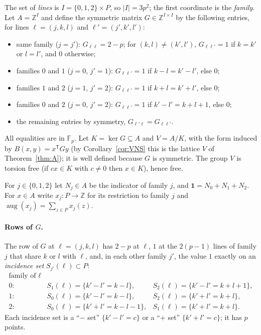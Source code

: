 \documentclass[11pt]{article}
\theoremstyle{definition}
\theoremstyle{remark}
\newcommand{\Z}{\mathbb{Z}}
\newcommand{\F}{\mathbb{F}}
\newcommand{\aug}{\operatorname{aug}}
\newcommand{\one}{\mathbf{1}}
\begin{document}
The set of \emph{lines} is $I=\{0,1,2\}\times P$, so $|I|=3p^2$; the first coordinate is the \emph{family}. Let $A=\Z^I$ and define the symmetric matrix $G\in\Z^{I\times I}$ by the following entries, for lines ${\ell}=(j,k,l)$ and ${\ell'}=(j',k',l')$:
\begin{itemize}
\item same family ($j=j'$): $G_{\ell\ell}=2-p$; for $(k,l)\neq(k',l')$, $G_{\ell\ell'}=1$ if $k=k'$ or $l=l'$, and $0$ otherwise;
\item families $0$ and $1$ ($j=0$, $j'=1$): $G_{\ell\ell'}=1$ if $k-l=k'-l'$, else $0$;
\item families $1$ and $2$ ($j=1$, $j'=2$): $G_{\ell\ell'}=1$ if $k+l=k'+l'$, else $0$;
\item families $0$ and $2$ ($j=0$, $j'=2$): $G_{\ell\ell'}=1$ if $k'-l'=k+l+1$, else $0$;
\item the remaining entries by symmetry, $G_{\ell'\ell}=G_{\ell\ell'}$.
\end{itemize}
All equalities are in $\F_p$. Let $K=\ker G\subseteq A$ and $V=A/K$, with the form induced by $B(x,y)=x^{\mathsf T}Gy$ (by Corollary~\ref{cor:VNS} this is the lattice $V$ of Theorem~\ref{thm:A}); it is well defined because $G$ is symmetric. The group $V$ is torsion free (if $cx\in K$ with $c\neq0$ then $x\in K$), hence free.

For $j\in\{0,1,2\}$ let $N_j\in A$ be the indicator of family $j$, and $\one=N_0+N_1+N_2$. For $x\in A$ write $x_j:P\to\Z$ for its restriction to family $j$ and $\aug(x_j)=\sum_{z\in P}x_j(z)$.

\paragraph{Rows of $G$.} The row of $G$ at ${\ell}=(j,k,l)$ has $2-p$ at ${\ell}$, $1$ at the $2(p-1)$ lines of family $j$ that share $k$ or $l$ with ${\ell}$, and, in each other family $j'$, the value $1$ exactly on an \emph{incidence set} $S_{j'}({\ell})\subset P$:
\[
\begin{array}{lll}
\text{family of }{\ell} & & \\
0: & S_1({\ell})=\{k'-l'=k-l\}, & S_2({\ell})=\{k'-l'=k+l+1\},\\
1: & S_0({\ell})=\{k'-l'=k-l\}, & S_2({\ell})=\{k'+l'=k+l\},\\
2: & S_0({\ell})=\{k'+l'=k-l-1\}, & S_1({\ell})=\{k'+l'=k+l\}.
\end{array}
\]
Each incidence set is a ``$-$ set'' $\{k'-l'=c\}$ or a ``$+$ set'' $\{k'+l'=c\}$; it has $p$ points.
\end{document}
